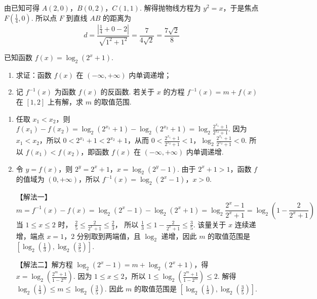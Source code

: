 \begin{solution}
由已知可得 \(A(2,0)\)，\(B(0,2)\)，\(C(1,1)\). 解得抛物线方程为 \(y^2=x\)，于是焦点 \(F\left(\frac{1}{4},0\right)\).
所以点 \(F\) 到直线 \(AB\) 的距离为
\[
d=\frac{\left|\frac14+0-2\right|}{\sqrt{1^2+1^2}}
=\frac{7}{4\sqrt2}=\frac{7\sqrt2}{8}
\]
\end{solution}

\begin{problem}
已知函数 \(f(x)=\log_2\left(2^x+1\right)\).

\begin{enumerate}
\item 求证：函数 \(f(x)\) 在 \((-\infty,+\infty)\) 内单调递增；
\item 记 \(f^{-1}(x)\) 为函数 \(f(x)\) 的反函数. 若关于 \(x\) 的方程 \(f^{-1}(x)=m+f(x)\) 在 \([1,2]\) 上有解，求 \(m\) 的取值范围.
\end{enumerate}
\end{problem}

\begin{solution}
\begin{enumerate}
\item 任取 \(x_1<x_2\)，则
\(f(x_1)-f(x_2)=\log_2\left(2^{x_1}+1\right)-\log_2\left(2^{x_2}+1\right)=\log_2\frac{2^{x_1}+1}{2^{x_2}+1}\).
因为 \(x_1<x_2\)，所以 \(0<2^{x_1}+1<2^{x_2}+1\)，从而
\(0<\frac{2^{x_1}+1}{2^{x_2}+1}<1\)，\(\log_2\frac{2^{x_1}+1}{2^{x_2}+1}<0\).
所以 \(f(x_1)<f(x_2)\)，即函数 \(f(x)\) 在 \((-\infty,+\infty)\) 内单调递增.

\item 令 \(y=f(x)\)，则
\(2^y=2^x+1\)，\(x=\log_2(2^y-1)\).
由于 \(2^x+1>1\)，函数 \(f\) 的值域为 \((0,+\infty)\)，所以
\(f^{-1}(x)=\log_2(2^x-1)\)，\(x>0\).

【解法一】
\[m=f^{-1}(x)-f(x)=\log_2\left(2^x-1\right)-\log_2\left(2^x+1\right)=\log_2\frac{2^x-1}{2^x+1}=\log_2\left(1-\frac{2}{2^x+1}\right)\]
当 \(1\leqslant x\leqslant 2\) 时，
\(\frac{2}{5}\leqslant \frac{2}{2^x+1}\leqslant \frac{2}{3}\)，
所以
\(\frac{1}{3}\leqslant 1-\frac{2}{2^x+1}\leqslant \frac{3}{5}\). 该量关于 \(x\) 连续递增，端点 \(x=1\)，\(2\) 分别取到两端值，且 \(\log_2\) 递增，因此 \(m\) 的取值范围是 \(\left[\log_2\left(\frac{1}{3}\right),\log_2\left(\frac{3}{5}\right)\right]\).

【解法二】解方程 \(\log_2\left(2^x-1\right)=m+\log_2\left(2^x+1\right)\)，得 \(x=\log_2\left(\frac{2^m+1}{1-2^m}\right)\).
因为 \(1\leqslant x\leqslant 2\)，所以
\(1\leqslant \log_2\left(\frac{2^m+1}{1-2^m}\right)\leqslant 2\). 解得 \(\log_2\left(\frac{1}{3}\right)\leqslant m\leqslant \log_2\left(\frac{3}{5}\right)\). 因此 \(m\) 的取值范围是 \(\left[\log_2\left(\frac{1}{3}\right),\log_2\left(\frac{3}{5}\right)\right]\).
\end{enumerate}
\end{solution}

